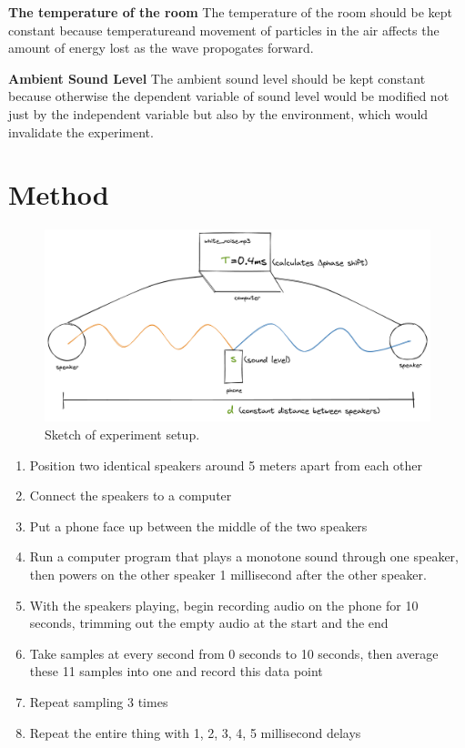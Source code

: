 \documentclass[12pt]{article}
\begin{document}
\textbf{The temperature of the room} The temperature of the room should be kept constant because temperatureand movement of particles in the air affects the amount of energy lost as the wave propogates forward.

\textbf{Ambient Sound Level} The ambient sound level should be kept constant because otherwise the dependent variable of sound level would be modified not just by the independent variable but also by the environment, which would invalidate the experiment.

\section{Method}

\begin{figure}[H]
    \centering
    \includegraphics[scale=0.24]{sound_diagram.png}
    \caption{Sketch of experiment setup.}
\end{figure}

\begin{enumerate}
    \item Position two identical speakers around 5 meters apart from each other
    \item Connect the speakers to a computer
    \item Put a phone face up between the middle of the two speakers
    \item Run a computer program that plays a monotone sound through one speaker, then powers on the other speaker 1 millisecond after the other speaker.
    \item With the speakers playing, begin recording audio on the phone for 10 seconds, trimming out the empty audio at the start and the end
    \item Take samples at every second from 0 seconds to 10 seconds, then average these 11 samples into one and record this data point
    \item Repeat sampling 3 times
    \item Repeat the entire thing with 1, 2, 3, 4, 5 millisecond delays
\end{enumerate}
\end{document}

